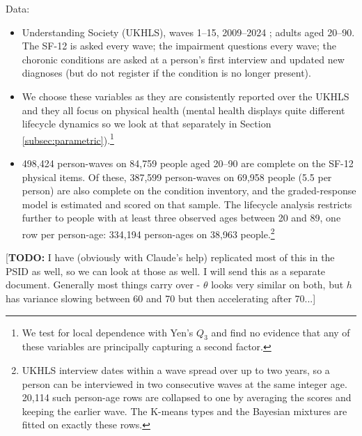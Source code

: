 \documentclass[11pt]{article}
\newcommand{\todo}[1]{\textcolor{red!75!black}{[\textbf{TODO:} #1]}}
\begin{document}
	
	
	Data:
	\begin{itemize}
			\item Understanding Society (UKHLS), waves 1--15, 2009--2024 \citep{ukhls}; adults aged 20--90. The SF-12 is asked every wave; the impairment questions every wave; the choronic conditions are asked at a person's first interview and updated new diagnoses (but do not register if the condition is no longer present).
			\item We choose these variables as they are consistently reported over the UKHLS and they all focus on physical health (mental health displays quite different lifecycle dynamics so we look at that separately in Section \ref{subsec:parametric}).\footnote{We test for local dependence with Yen's $Q_3$ and find no evidence that any of these variables are principally capturing a second factor.}
			\item 498,424 person-waves on 84,759 people aged 20--90 are complete on the SF-12 physical items. Of these, 387,599 person-waves on 69,958 people (5.5 per person) are also complete on the condition inventory, and the graded-response model is estimated and scored on that sample. The lifecycle analysis restricts further to people with at least three observed ages between 20 and 89, one row per person-age: 334,194 person-ages on 38,963 people.\footnote{UKHLS interview dates within a wave spread over up to two years, so a person can be interviewed in two consecutive waves at the same integer age. 20,114 such person-age rows are collapsed to one by averaging the scores and keeping the earlier wave. The K-means types and the Bayesian mixtures are fitted on exactly these rows.}
	\end{itemize}	

	\todo{I have (obviously with Claude's help) replicated most of this in the PSID as well, so we can look at those as well. I will send this as a separate document. Generally most things carry over - $\theta$ looks very similar on both, but $h$ has variance slowing between 60 and 70 but then accelerating after 70...}
	
\end{document}
